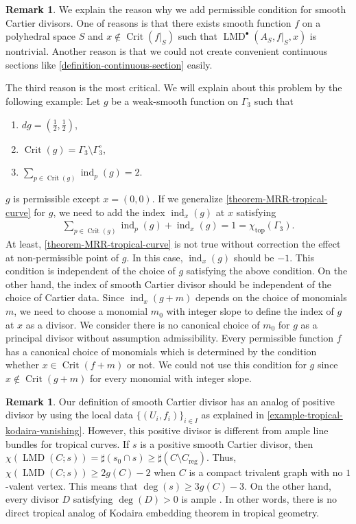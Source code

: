 \documentclass[a4paper,dvipdfmx,reqno,12pt]{amsart}
\theoremstyle{definition}
\newtheorem{remark}[theorem]{Remark}
\newcommand{\opn}[1]{\operatorname{#1}}
\numberwithin{equation}{section}
\begin{document}
\begin{remark}
\label{remark-non-permissible-divisor}
We explain the reason why we add permissible condition for 
smooth Cartier divisors. 
One of reasons is that there exists smooth function $f$
on a polyhedral space $S$ and 
$x\notin\opn{Crit}(f|_S)$ such that
$\opn{LMD}^{\bullet}(A_S,f|_{S},x)$ is nontrivial.
Another reason is that we could not create 
convenient continuous sections like 
\cref{definition-continuous-section} easily.

The third reason is the most critical. 
We will explain about this problem by the following 
example:
Let 
$g$ be a weak-smooth function on 
$\Gamma_3$
such that 
\begin{enumerate}
\item $dg=(\frac{1}{2},\frac{1}{2})$,
\item $\opn{Crit}(g)=\Gamma_3\setminus \Gamma_3^{\circ}$,
\item $\sum_{p\in \opn{Crit}(g)}\opn{ind}_p(g)=2$.
\end{enumerate}
$g$ is permissible except $x=(0,0)$.
If we generalize 
\cref{theorem-MRR-tropical-curve} for $g$, 
we need to add the index $\opn{ind}_x(g)$ at $x$ satisfying
\begin{align}
\sum_{p\in \opn{Crit}(g)}\opn{ind}_p(g)+
\opn{ind}_x(g)=1=\chi_{\opn{top}}(\Gamma_3).
\end{align}
At least, \cref{theorem-MRR-tropical-curve} is not
true without correction the effect at non-permissible point
of $g$.
In this case, $\opn{ind}_x(g)$ should be $-1$.
This condition is independent of the choice
of $g$ satisfying the above condition.
On the other hand, the index of smooth Cartier
divisor should be independent of the choice of
Cartier data.
Since $\opn{ind}_x(g+m)$ depends on the choice
of monomials $m$, we need to choose a monomial $m_0$
with integer slope to 
define the index of $g$ at $x$ as a divisor.
We consider there is no canonical choice
of $m_0$ for $g$ as a principal divisor without
assumption admissibility.
Every permissible function $f$ has a canonical choice
of monomials which is determined by the condition 
whether $x\in \opn{Crit}(f+m)$ or not.
We could not use this condition for $g$ since 
$x\notin \opn{Crit}(g+m)$ for every monomial with
integer slope.
\end{remark}

\begin{remark}
Our definition of smooth Cartier divisor 
has an analog of positive divisor by using 
the local data $\{(U_i,f_i)\}_{i\in I}$ as 
explained in \cref{example-tropical-kodaira-vanishing}.
However, this positive divisor is different 
from ample line bundles for tropical curves. 
If $s$ is a positive smooth Cartier divisor, then
$\chi(\opn{LMD}(C;s))=\sharp(s_0\cap s)\geq \sharp 
(C\setminus C_{\opn{reg}})$. 
Thus, $\chi(\opn{LMD}(C;s))\geq 2g(C)-2$
when $C$ is a compact trivalent
graph with no $1$-valent vertex. This means that
$\opn{deg}(s)\geq 3g(C)-3$.
On the other hand, every divisor $D$ satisfying
$\opn{deg}(D)>0$ is ample \cite[Corollary 43]{MR2892941}.
In other words, there is no direct tropical
analog of Kodaira embedding theorem
in tropical geometry.
\end{remark}
\end{document}
